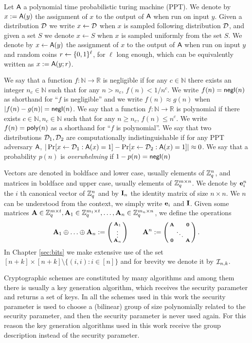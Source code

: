 Let $\mathsf{A}$ a polynomial time probabilistic turing machine (PPT). We denote by $x:=\mathsf{A}(y)$ the assignment of $x$ to the output of $\mathsf{A}$ when run on input $y$. Given a distribution $\mathcal{D}$ we write $x\gets\mathcal{D}$ when $x$ is sampled following distribution $\mathcal{D}$, and given a set $S$ we denote $x\gets S$ when $x$ is sampled uniformly from the set $S$. We denote by $x\gets\mathsf{A}(y)$ the assignment of $x$ to the output of $\mathsf{A}$ when run on input $y$ and random coins $r\gets\{0,1\}^\ell$, for $\ell$ long enough, which can be equivalently written as $x:=\mathsf{A}(y;r)$. 

We say that a function $f:\mathbb{N}\to\mathbb{R}$ is negligible if for any $c\in\mathbb{N}$ there exists an integer $n_c\in\mathbb{N}$ such that for any $n> n_c$, $f(n)<1/n^c$. We write $f(n)=\mathsf{negl}(n)$ as shorthand for ``$f$ is negligible'' and we write $f(n)\approx g(n)$ when $|f(n)-g(n)|=\mathsf{negl}(n)$. We say that a function $f:\mathbb{N}\to\mathbb{R}$ is polynomial if there exists $c\in\mathbb{N},n_c\in\mathbb{N}$ such that for any $n\geq n_c$, $f(n)\leq n^c$. We write $f(n)=\mathsf{poly}(n)$ as a shorthand for ``$f$ is polynomial''.
We say that two distributions $\mathcal{D}_1,\mathcal{D}_2$ are computationally indistinguishable if for any PPT adversary $\mathsf{A}$, $|\Pr[x\gets\mathcal{D}_1: \mathsf{A}(x)=1]-\Pr[x\gets\mathcal{D}_2: \mathsf{A}(x)=1]|\approx 0$. We say that a probability $p(n)$ is \emph{overwhelming} if $1-p(n)=\mathsf{negl}(n)$

Vectors are denoted in boldface and lower case, usually elements of $\mathbb{Z}_q^n$, and matrices in boldface and upper case, usually elements of $\mathbb{Z}_q^{m\times n}$. We denote by $\mathbf{e}_i^n$ the $i$ th canonical vector of $\mathbb{Z}_q^n$ and by $\mathbf{{I}}_{n}$ the identity matrix of size $n\times n$. We $n$ can be understood from the context, we simply write $\mathbf{e}_i$ and $\mathbf{{I}}$. Given some matrices $\mathbf{{A}}\in\mathbb{Z}_q^{m\times t},\mathbf{{A}}_1\in\mathbb{Z}_q^{m_1\times t},\ldots,\mathbf{{A}}_n\in\mathbb{Z}_q^{m_n\times n}$, we define the operations
 $$\mathbf{A}_1 \oplus \ldots \oplus \mathbf{A}_n:=\left(\begin{smallmatrix} \mathbf{A}_1 \\ \vdots \\  \mathbf{A}_n\end{smallmatrix}\right) \qquad 
\mathbf{{A}}^n:=\left(\begin{smallmatrix} \mathbf{{A}} &  & \mathbf{{0}} \\   & \ddots &   \\ \mathbf{{0}} &  & \mathbf{{A}}
\end{smallmatrix}\right).$$
In Chapter \ref{sec:bits} we make extensive use of the set $[n+k]\times[n+k]\setminus\{(i,i):i\in[n]\}$ and for brevity we denote it by $\mathcal{I}_{n,k}$.

Cryptographic schemes are constituted by many algorithms and among them there is usually a key generation algorithm, which receives the security parameter and returns a set of keys. In all the schemes used in this work the security parameter is used to choose a (bilinear) group of size polynomially related to the security parameter, and then the security parameter is never used again. For this reason the key generation algorithms used in this work receive the group description instead of the security parameter.
